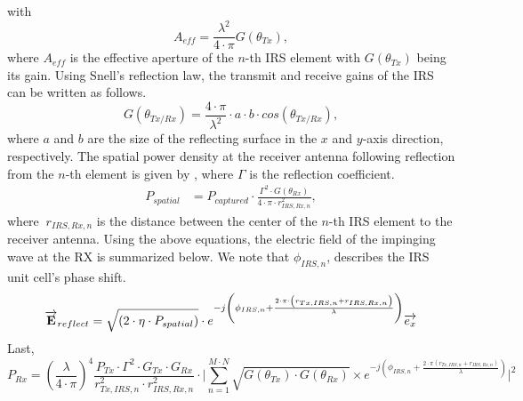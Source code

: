 with
\begin{equation}
	A_{eff} = \frac{\lambda^2}{4 \cdot \pi} G(\theta_{Tx}),
\end{equation}
where $A_{eff}$ is the effective aperture of the $n$-th \ac{IRS} element with $G(\theta_{Tx})$ being its gain. Using Snell's reflection law, the transmit and receive gains of the IRS can be written as follows.
\begin{equation} \label{Eq:model2 gain Tx}
	G(\theta_{Tx/Rx})= \frac{4 \cdot \pi}{\lambda^2} \cdot a \cdot b \cdot cos(\theta_{Tx/Rx}),
\end{equation}
where $a$ and $b$ are the size of the reflecting surface in the $x$ and $y$-axis direction, respectively. The spatial power density at the receiver antenna following reflection from the $n$-th element is given by  , where $\Gamma$ is the reflection coefficient.
\begin{equation} \label{Eq:model2 spatial power density}
	\begin{split}
		P_{spatial} &= P_{captured} \cdot \frac{\Gamma^2 \cdot G(\theta_{Rx})}{4 \cdot \pi \cdot r_{IRS,Rx, n}^2},
	\end{split}
\end{equation}
where $\ r_{IRS, Rx, n}$ is the distance between the center of the $n$-th \ac{IRS} element to the receiver antenna. Using the above equations, the electric field of the impinging wave at the RX is summarized below. We note that  $\phi_{IRS, n} $, describes the IRS unit cell's phase shift. 
\begin{equation} \label{Eq:model2 electric field reflect}
	\overrightarrow{\textbf{E}}_{reflect}= \sqrt{ \left( 2 \cdot \eta \cdot P_{spatial} \right) } \cdot e^{-j \left( \phi_{IRS, n} + \frac{2 \cdot \pi \cdot \left( r_{Tx,IRS, n}+r_{IRS,Rx, n} \right) }{\lambda} \right) } {\overrightarrow{e_x}}\\
\end{equation}
Last,
\begin{equation} \label{Eq:model2 power received}
	P_{Rx} = \left( \frac{\lambda}{4 \cdot \pi} \right)^4 \frac{P_{Tx} \cdot \Gamma^2 \cdot G_{Tx} \cdot G_{Rx}}{r_{Tx,IRS, n}^2 \cdot r_{IRS,Rx, n}^2} \cdot \Bigg|\sum_{n=1}^{M \cdot N} \sqrt{G(\theta_{Tx}) \cdot G(\theta_{Rx})} \times e^{-j \left( \phi_{IRS, n} + \frac{2 \cdot \pi \left( r_{Tx,IRS, n}+ r_{IRS,Rx, n} \right) }{\lambda} \right) } \Bigg| ^2
\end{equation}
